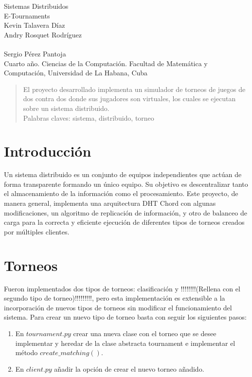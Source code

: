 \documentclass[10pt, a4paper]{article}
\begin{document}
	\begin{center}
		\large{Sistemas Distribuidos} \\
		\huge{E-Tournaments}\\
		\vspace{1em}
		\normalsize Kevin Talavera D\'iaz \\ Andry Rosquet Rodr\'iguez \\ \\ Sergio P\'erez Pantoja\\
		\vspace{1em}
		\small Cuarto a\~no. Ciencias de la Computaci\'on.
		\small Facultad de Matem\'atica y Computaci\'on, Universidad de La Habana, Cuba
	\end{center}

    \begin{abstract}
    	El proyecto desarrollado implementa un simulador de torneos de juegos de dos contra dos donde sus jugadores son virtuales, los cuales se ejecutan sobre un sistema distribuido.\\
    	Palabras claves: sistema, distribuido, torneo 
    \end{abstract}
    \section{Introducci\'on}
    Un sistema distribuido es un conjunto de equipos independientes que act\'uan de forma transparente formando un \'unico equipo. Su objetivo es descentralizar tanto el almacenamiento de la informaci\'on como el procesamiento. Este proyecto, de manera general, implementa una arquitectura DHT Chord con algunas modificaciones, un algoritmo de replicaci\'on de informaci\'on, y otro de balanceo de carga para la correcta y eficiente ejecuci\'on de diferentes tipos de torneos creados por m\'ultiples clientes.
    
    \section{Torneos}
    Fueron implementados dos tipos de torneos: clasificación y !!!!!!!!(Rellena con el segundo tipo de torneo)!!!!!!!!!, pero esta implementación es extensible a la incorporación de nuevos tipos de torneos sin modificar el funcionamiento del sistema. Para crear un nuevo tipo de torneo basta con seguir los siguientes pasos:\\
    \begin{enumerate}
    	\item En $tournament.py$ crear una nueva clase con el torneo que se desee implementar y heredar de la clase abstracta tournament e implementar el método $create\_matching()$.\\
    	\item En $client.py$ añadir la opción de crear el nuevo torneo añadido.\\
    \end{enumerate}
    
\end{document}
